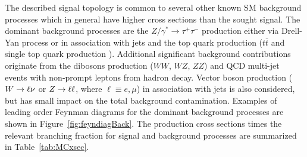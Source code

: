 The described signal topology  is common to several other known SM background  processes which in general  
have higher cross sections than the sought signal.
The dominant background processes are the  $Z/\gamma^* \rightarrow \tau^+ \tau^- $ production
either via Drell-Yan process or in association with jets and the top quark production ($t\bar{t}$ and single top quark production ). 
Additional significant background contributions originate from the  dibosons production 
($WW$, $WZ$, $ZZ$) and QCD multi-jet events with non-prompt leptons  from hadron decay.
Vector boson production ($W\rightarrow \ell \nu$ or $Z\rightarrow \ell \ell$, where $\ell \equiv e,\mu$)  in association with jets 
is also considered, but has small impact on the total background contamination. Examples of 
leading order Feynman diagrams for the dominant background processes are shown in Figure~\ref{fig:feyndiagBack}.
The production cross sections times the relevant branching fraction for signal and background processes are summarized in
Table~\ref{tab:MCxsec}. 
%

